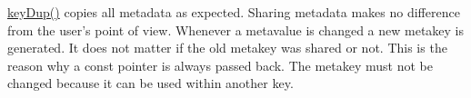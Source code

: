 {\ttfamily \hyperlink{group__key_gae6ec6a60cc4b8c1463fa08623d056ce3}{key\+Dup()}} copies all metadata as expected. Sharing metadata makes no difference from the user's point of view. Whenever a metavalue is changed a new metakey is generated. It does not matter if the old metakey was shared or not. This is the reason why a const pointer is always passed back. The metakey must not be changed because it can be used within another key. 